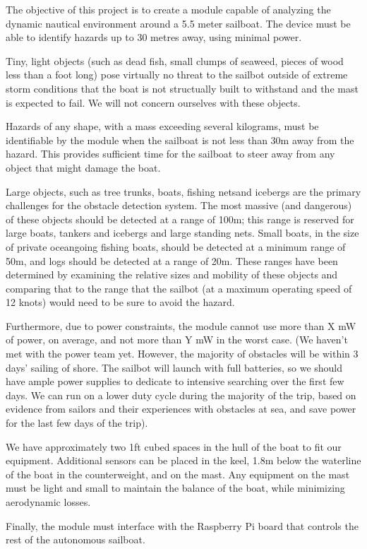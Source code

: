 The objective of this project is to create a module capable of analyzing the dynamic nautical environment around a 5.5 meter sailboat. The device must be able to identify hazards up to 30 metres away, using minimal power.

Tiny, light objects (such as dead fish, small clumps of seaweed, pieces of wood less than a foot long) pose virtually no threat to the sailbot outside of extreme storm conditions that the boat is not structually built to withstand and the mast is expected to fail. We will not concern ourselves with these objects.

Hazards of any shape, with a mass exceeding several kilograms, must be identifiable by the module when the sailboat is not less than 30m away from the hazard. This provides sufficient time for the sailboat to steer away from any object that might damage the boat.

Large objects, such as tree trunks, boats, fishing netsand icebergs are the primary challenges for the obstacle detection system. The most massive (and dangerous) of these objects should be detected at a range of 100m; this range is reserved for large boats, tankers and icebergs and large standing nets. Small boats, in the size of private oceangoing fishing boats, should be detected at a minimum range of 50m, and logs should be detected at a range of 20m. These ranges have been determined by examining the relative sizes and mobility of these objects and comparing that to the range that the sailbot (at a maximum operating speed of 12 knots) would need to be sure to avoid the hazard.

Furthermore, due to power constraints, the module cannot use more than X mW of power, on average, and not more than Y mW in the worst case. (We haven't met with the power team yet. However, the majority of obstacles will be within 3 days' sailing of shore. The sailbot will launch with full batteries, so we should have ample power supplies to dedicate to intensive searching over the first few days. We can run on a lower duty cycle during the majority of the trip, based on evidence from sailors and their experiences with obstacles at sea, and save power for the last few days of the trip).

We have approximately two 1ft cubed spaces in the hull of the boat to fit our equipment. Additional sensors can be placed in the keel, 1.8m below the waterline of the boat in the counterweight, and on the mast. Any equipment on the mast must be light and small to maintain the balance of the boat, while minimizing aerodynamic losses.

Finally, the module must interface with the Raspberry Pi board that controls the rest of the autonomous sailboat.